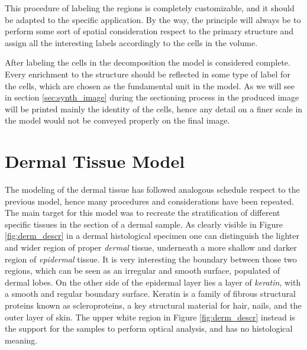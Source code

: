     This procedure of labeling the regions is completely customizable, and it should be adapted to the specific application. By the way, the principle will always be to perform some sort of spatial consideration respect to the primary structure and assign all the interesting labels accordingly to the cells in the volume.

    After labeling the cells in the decomposition the model is considered complete. Every enrichment to the structure should be reflected in some type of label for the cells, which are chosen as the fundamental unit in the model. As we will see in section \ref{sec:synth_image} during the sectioning process in the produced image will be printed mainly the identity of the cells, hence any detail on a finer scale in the model would not be conveyed properly on the final image.

\section{Dermal Tissue Model} \label{ssec:derm_tis_mod}
    The modeling of the dermal tissue has followed analogous schedule respect to the previous model, hence many procedures and considerations have been repeated. The main target for this model was to recreate the stratification of different specific tissues in the section of a dermal sample. As clearly visible in Figure \ref{fig:derm_descr} in a dermal histological specimen one can distinguish the lighter and wider region of proper \textit{dermal} tissue, underneath a more shallow and darker region of \textit{epidermal} tissue. It is very interesting the boundary between those two regions, which can be seen as an irregular and smooth surface, populated of dermal lobes. On the other side of the epidermal layer lies a layer of \textit{keratin}, with a smooth and regular boundary surface. Keratin is a family of fibrous structural proteins known as scleroproteins, a key structural material for hair, nails, and the outer layer of skin. The upper white region in Figure \ref{fig:derm_descr} instead is the support for the samples to perform optical analysis, and has no histological meaning.


